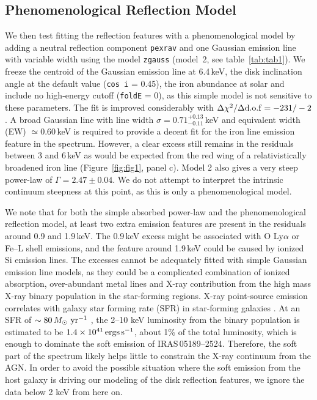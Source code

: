 \documentclass[]{emulateapj}
\newcommand{\Msun}      {\mbox{$M_{\mathord\odot}$}}
\begin{document}
\subsection{Phenomenological Reflection Model}
We then test fitting the reflection features with a phenomenological model by adding a neutral reflection component {\tt pexrav} \citep{mag95} and one Gaussian emission line with variable width using the model {\tt zgauss} (model~2, see table~\ref{tab:tab1}). We freeze the centroid of the Gaussian emission line at 6.4\,keV, the disk inclination angle at the default value ({\tt cos\,i} = 0.45), the iron abundance at solar and include no high-energy cutoff ({\tt foldE} = 0), as this simple model is not sensitive to these parameters. The fit is improved considerably with $\Delta \chi^{2}/\Delta{\rm d.o.f} = -231/-2$. A broad Gaussian line with line width $\sigma = 0.71^{+0.13}_{-0.11}$\,keV and equivalent width (EW) $\simeq 0.60$\,keV is required to provide a decent fit for the iron line emission feature in the spectrum. However, a clear excess still remains in the residuals between 3 and 6\,keV as would be expected from the red wing of a relativistically broadened iron line (Figure~\ref{fig:fig1}, panel c). Model 2 also gives a very steep power-law of $\Gamma=2.47\pm0.04$. We do not attempt to interpret the intrinsic continuum steepness at this point, as this is only a phenomenological model.

We note that for both the simple absorbed power-law and the phenomenological reflection model, at least two extra emission features are present in the residuals around 0.9 and 1.9\,keV. The 0.9\,keV excess might be associated with O Ly$\alpha$ or Fe--L shell emissions, and the feature around 1.9\,keV could be caused by ionized Si emission lines. The excesses cannot be adequately fitted with simple Gaussian emission line models, as they could be a complicated combination of ionized absorption, over-abundant metal lines and X-ray contribution from the high mass X-ray binary population in the star-forming regions. X-ray point-source emission correlates with galaxy star forming rate (SFR) in star-forming galaxies \citep{leh10}. At an SFR of $\sim80\,\Msun\,\rm\,yr^{-1}$ \citep{wes12}, the 2--10 keV luminosity from the binary population is estimated to be $1.4\times10^{41}\rm\,ergs\,s^{-1}$, about 1\% of the total luminosity, which is enough to dominate the soft emission of {IRAS\,05189--2524}. Therefore, the soft part of the spectrum likely helps little to constrain the X-ray continuum from the AGN. In order to avoid the possible situation where the soft emission from the host galaxy is driving our modeling of the disk reflection features, we ignore the data below 2 keV from here on.
                
\end{document}
